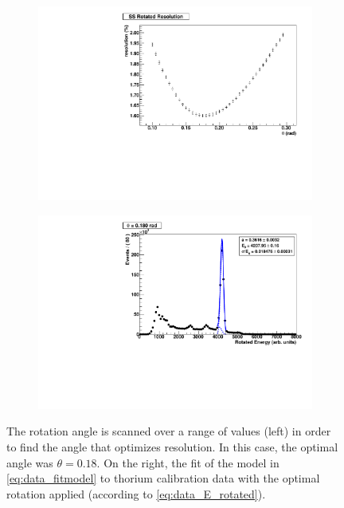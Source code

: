 \documentclass[herrin-thesis.tex]{subfiles}
\begin{document}
\begin{figure}[htbp]
	\begin{subfigure}[t]{0.48\textwidth}
		\centering
		\includegraphics[width=\textwidth]{./plots/data_finding_theta_scan.pdf}
	\end{subfigure}\hfill%
	\begin{subfigure}[t]{0.48\textwidth}
		\centering
		\includegraphics[width=\textwidth]{./plots/data_finding_theta_best.pdf}
	\end{subfigure}
	\caption[Finding the optimal rotation angle]{The rotation angle is scanned over a range of values (left) in order to find the angle that optimizes resolution. In this case, the optimal angle was \(\theta = 0.18\). On the right, the fit of the model in \cref{eq:data_fitmodel} to thorium calibration data with the optimal rotation applied (according to \cref{eq:data_E_rotated}).}
	\label{fig:data_finding_theta}
\end{figure}
\end{document}
